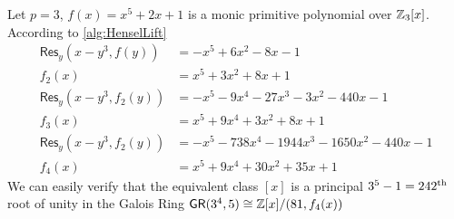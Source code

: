 \fi
\begin{example}
    Let \(p = 3\), \(f(x) = x^5 + 2x + 1\) is a monic primitive polynomial over \(\mathbb{Z}_3[x]\). According to \cref{alg:HenselLift}
    \begin{align*}
        \mathsf{Res}_y(x - y^3, f(y)) &= -x^5 + 6x^2 - 8x - 1 \\
        f_2(x) &= x^5 + 3x^2 + 8x + 1 \\
        \mathsf{Res}_y(x - y^3, f_2(y)) &= -x^5 - 9x^4 - 27x^3 - 3x^2 - 440x - 1 \\
        f_3(x) &= x^5 + 9x^4 + 3x^2 + 8x + 1 \\
        \mathsf{Res}_y(x - y^3, f_2(y)) &= -x^5 - 738x^4 - 1944x^3 - 1650x^2 - 440x - 1 \\
        f_4(x) &= x^5 + 9x^4 + 30x^2 + 35x + 1
    \end{align*}
    We can easily verify that the equivalent class \([x]\) is a principal \(3^5 - 1 = 242\textsuperscript{th}\) root of unity in the Galois Ring \(\mathsf{GR}(3^4, 5) \cong \mathbb{Z}[x]/(81, f_4(x))\)
\end{example}